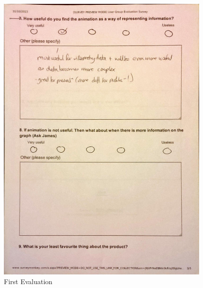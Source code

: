 \begin{figure}[h!]
    \centering
    \includegraphics[width=0.95\textwidth]{images/user_eval/user_eval_7.jpg}
    \caption{First Evaluation}
\end{figure}

